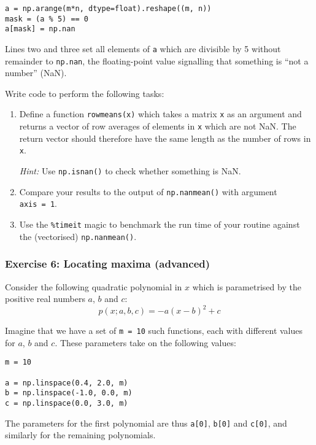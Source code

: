 \documentclass{scrartcl}
\begin{document}
\begin{verbatim}
a = np.arange(m*n, dtype=float).reshape((m, n))
mask = (a % 5) == 0
a[mask] = np.nan
\end{verbatim}

Lines two and three set all elements of \texttt{a} which are divisible
by 5 without remainder to \texttt{np.nan}, the floating-point value
signalling that something is ``not a number'' (NaN).

Write code to perform the following tasks:

\begin{enumerate}
\def\labelenumi{\arabic{enumi}.}
\item
  Define a function \texttt{rowmeans(x)} which takes a matrix \texttt{x}
  as an argument and returns a vector of row averages of elements in
  \texttt{x} which are not NaN. The return vector should therefore have
  the same length as the number of rows in \texttt{x}.

  \emph{Hint:} Use \texttt{np.isnan()} to check whether something is
  NaN.
\item
  Compare your results to the output of \texttt{np.nanmean()} with
  argument \texttt{axis\ =\ 1}.
\item
  Use the \texttt{\%timeit} magic to benchmark the run time of your
  routine against the (vectorised) \texttt{np.nanmean()}.
\end{enumerate}

    \hypertarget{exercise-6-locating-maxima-advanced}{%
\subsubsection{Exercise 6: Locating maxima
(advanced)}\label{exercise-6-locating-maxima-advanced}}

Consider the following quadratic polynomial in \(x\) which is
parametrised by the positive real numbers \(a\), \(b\) and \(c\): \[
p(x;a,b,c) = -a (x-b)^2 + c
\]

Imagine that we have a set of \texttt{m\ =\ 10} such functions, each
with different values for \(a\), \(b\) and \(c\). These parameters take
on the following values:

\begin{verbatim}
m = 10

a = np.linspace(0.4, 2.0, m)
b = np.linspace(-1.0, 0.0, m)
c = np.linspace(0.0, 3.0, m)
\end{verbatim}

The parameters for the first polynomial are thus \texttt{a{[}0{]}},
\texttt{b{[}0{]}} and \texttt{c{[}0{]}}, and similarly for the remaining
polynomials.
\end{document}

